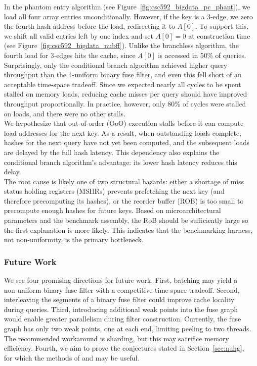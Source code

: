 \noindent
In the phantom entry algorithm (see Figure~\ref{fig:csc592_bigdata_pc_phant}), we load all four array entries unconditionally. However, if the key is a 3-edge, 
we zero the fourth hash address before the load, redirecting it to $A[0]$. To support this, we shift all valid entries left by one index and set $A[0] = 0$ at
construction time (see Figure~\ref{fig:csc592_bigdata_nubff}). Unlike the branchless algorithm, the fourth load for 3-edges hits the cache, since $A[0]$ is 
accessed in 50\% of queries. \\



\noindent
Surprisingly, only the conditional branch algorithm achieved higher query throughput than the 4-uniform binary fuse filter, and even this fell short of an 
acceptable time-space tradeoff. Since we expected nearly all cycles to be spent stalled on memory loads, reducing cache misses per query should have improved 
throughput proportionally. In practice, however, only 80\% of cycles were stalled on loads, and there were no other stalls. \\

\noindent
We hypothesize that out-of-order (OoO) execution stalls before it can compute load addresses for the next key. As a result, when outstanding loads complete, 
hashes for the next query have not yet been computed, and the subsequent loads are delayed by the full hash latency. This dependency also explains the 
conditional branch algorithm's advantage: its lower hash latency reduces this delay. \\

\noindent
The root cause is likely one of two structural hazards: either a shortage of miss status holding registers (MSHRs) prevents prefetching the next key (and 
therefore precomputing its hashes), or the reorder buffer (ROB) is too small to precompute enough hashes for future keys. Based on microarchitectural 
parameters and the benchmark assembly, the RoB should be sufficiently large so the first explanation is more likely. This indicates that the benchmarking 
harness, not non-uniformity, is the primary bottleneck. 

\subsubsection{Future Work}

We see four promising directions for future work. First, batching may yield a non-uniform binary fuse filter with a competitive time-space tradeoff. Second, 
interleaving the segments of a binary fuse filter could improve cache locality during queries. Third, introducing additional weak points into the fuse graph 
would enable greater parallelism during filter construction. Currently, the fuse graph has only two weak points, one at each end, limiting peeling to two 
threads. The recommended workaround is sharding, but this may sacrifice memory efficiency. Fourth, we aim to prove the conjectures stated in 
Section~\ref{sec:nuhg}, for which the methods of \cite{dietzfelbinger2019} and \cite{walzer2021} may be useful.

